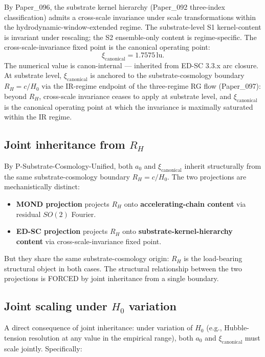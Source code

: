 \documentclass[11pt,a4paper]{article}
\begin{document}
By Paper\_096, the substrate kernel hierarchy (Paper\_092 three-index classification) admits a cross-scale invariance under scale transformations within the hydrodynamic-window-extended regime. The substrate-level S1 kernel-content is invariant under rescaling; the S2 ensemble-only content is regime-specific. The cross-scale-invariance fixed point is the canonical operating point:
\[
\xi_\mathrm{canonical} = 1.7575\,\mathrm{lu}.
\]
The numerical value is canon-internal --- inherited from ED-SC 3.3.x arc closure. At substrate level, $\xi_\mathrm{canonical}$ is anchored to the substrate-cosmology boundary $R_H = c/H_0$ via the IR-regime endpoint of the three-regime RG flow (Paper\_097): beyond $R_H$, cross-scale invariance ceases to apply at substrate level, and $\xi_\mathrm{canonical}$ is the canonical operating point at which the invariance is maximally saturated within the IR regime.

\subsection{Joint inheritance from $R_H$}

By P-Substrate-Cosmology-Unified, both $a_0$ and $\xi_\mathrm{canonical}$ inherit structurally from the same substrate-cosmology boundary $R_H = c/H_0$. The two projections are mechanistically distinct:

\begin{itemize}[noitemsep]
\item \textbf{MOND projection} projects $R_H$ onto \textbf{accelerating-chain content} via residual $SO(2)$ Fourier.
\item \textbf{ED-SC projection} projects $R_H$ onto \textbf{substrate-kernel-hierarchy content} via cross-scale-invariance fixed point.
\end{itemize}

But they share the same substrate-cosmology origin: $R_H$ is the load-bearing structural object in both cases. The structural relationship between the two projections is FORCED by joint inheritance from a single boundary.

\subsection{Joint scaling under $H_0$ variation}

A direct consequence of joint inheritance: under variation of $H_0$ (e.g., Hubble-tension resolution at any value in the empirical range), both $a_0$ and $\xi_\mathrm{canonical}$ must scale jointly. Specifically:
\end{document}
